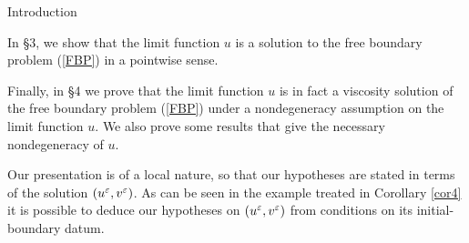 \begin{section}{Introduction}
\medskip

In \S 3, we show that the limit function $u$ is a solution to the free
boundary problem (\ref{FBP}) 
in a pointwise sense. 

\medskip

Finally, in \S 4 we prove
that the limit function $u$ is in fact a viscosity solution of the free
boundary problem 
(\ref{FBP}) under a nondegeneracy assumption on the limit function $u$. We also
prove some results that give the necessary nondegeneracy of $u$.

Our presentation is of a local nature, so that our hypotheses are stated in terms of the
solution $(u^\varepsilon,v^\varepsilon)$.  As can be seen in the example
treated in Corollary \ref{cor4}  it is possible to deduce our hypotheses on $(u^\varepsilon,v^\varepsilon)$ from 
conditions on its initial-boundary datum.

\end{section}

\bigskip


